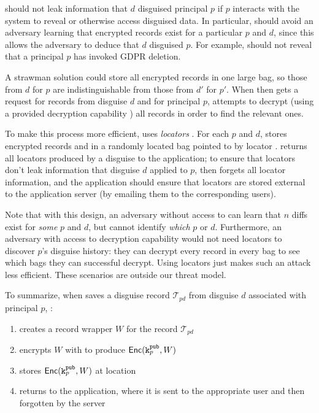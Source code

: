 \sys should not leak information that $d$ disguised principal $p$ if $p$ interacts with the system
to reveal or otherwise access disguised data. In particular, \sys should avoid an adversary learning
that encrypted records exist for a particular $p$ and $d$, since this allows the adversary to deduce
that $d$ disguised $p$. For example, \sys should not reveal that a principal $p$ has invoked GDPR
deletion.

A strawman solution could store all encrypted records in one large bag, so those from
$d$ for $p$ are indistinguishable from those from $d'$ for $p'$. When \sys then gets a request for
records from disguise $d$ and for principal $p$, \sys attempts to decrypt (using a provided
decryption capability ) all records in order to find the relevant ones.

To make this process more efficient, \sys uses \emph{locators }. For each $p$ and $d$,
\sys stores encrypted records  and  in a randomly located bag pointed to by
locator . \sys returns all locators produced by a disguise to the application; to ensure
that locators don't leak information that disguise $d$ applied to $p$, \sys then forgets all locator
information, and the application should ensure that locators are stored external to the application
server (\eg by emailing them to the corresponding users).

Note that with this design, an adversary without access to  can learn that $n$ diffs exist
for \emph{some} $p$ and $d$, but cannot identify \emph{which} $p$ or $d$.
%
Furthermore, an adversary with access to decryption capability  would not need locators to
discover $p$'s disguise history: they can decrypt every record in every bag to see which bags they
can successful decrypt. Using locators just makes such an attack less efficient.
%
These scenarios are outside our threat model.


To summarize, when \sys saves a disguise record $\mathcal{T}_{pd}$ from disguise $d$ associated with principal $p$, \sys:
\begin{enumerate}
    \item creates a record wrapper $W$ for the record $\mathcal{T}_{pd}$
    \item encrypts $W$ with  to produce $\mathsf{Enc}(\texttt{\ensuremath{\texttt{k}^{\text{pub}}_{p}}}, W)$
    \item stores $\mathsf{Enc}(\texttt{\ensuremath{\texttt{k}^{\text{pub}}_{p}}}, W)$ at location 
    \item returns  to the application, where it is sent to the appropriate user and then
        forgotten by the server
\end{enumerate}

